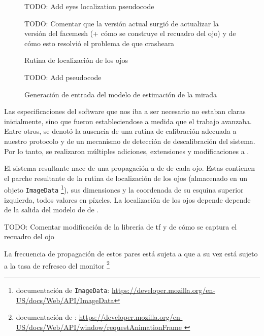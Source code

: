 \begin{figure}
  TODO: Add eyes localization pseudocode

  TODO: Comentar que la versión actual surgió de actualizar la versión del
        facemesh (+ cómo se construye el recuadro del ojo) y de cómo esto
        resolvió el problema de que crasheara \webgazer

  \caption{Rutina de localización de los ojos}
  \label{fig:eyes-localization}
\end{figure}

\begin{figure}
  TODO: Add pseudocode
  \caption{Generación de entrada del modelo de estimación de la mirada}
  \label{fig:eye-features-to-model-input}
\end{figure}

Las especificaciones del software que nos iba a ser necesario no estaban claras
inicialmente, sino que fueron estableciendose a medida que el trabajo avanzaba.
Entre otros, se denotó la ausencia de una rutina de calibración adecuada a
nuestro protocolo y de un mecanismo de detección de descalibración del sistema.
Por lo tanto, se realizaron múltiples adiciones, extensiones y modificaciones a
\webgazer.

El sistema resultante nace de una propagación \frame a \frame de \features de
cada ojo.
Estas contienen el parche resultante de la rutina de localización de los ojos
(almacenado en un objeto \texttt{ImageData} \footnote{documentación de
\texttt{ImageData}:
\url{https://developer.mozilla.org/en-US/docs/Web/API/ImageData}}), sus
dimensiones y la coordenada de su esquina superior izquierda, todos valores en
píxeles.
La localización de los ojos depende depende de la salida del modelo de
\facemesh de \tfjs.

TODO: Comentar modificación de la librería de tf y de cómo se captura el
      recuadro del ojo

La frecuencia de propagación de estos pares está sujeta a \raf que a su vez
está sujeto a la tasa de refresco del monitor \footnote{documentación de \raf:
\url{
  https://developer.mozilla.org/en-US/docs/Web/API/window/requestAnimationFrame
}}

